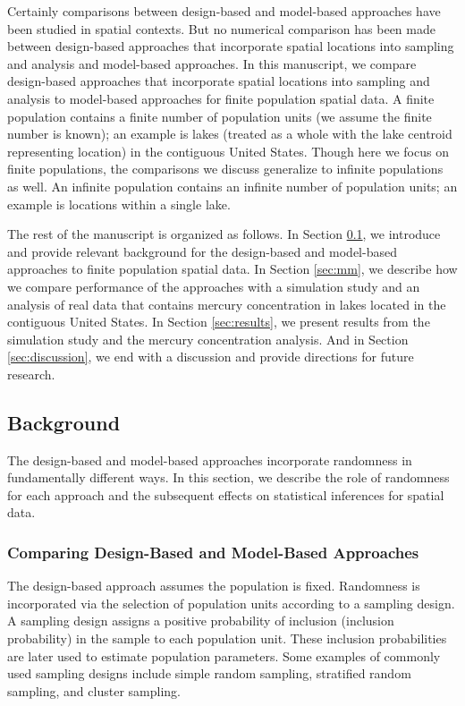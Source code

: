 \documentclass[]{elsarticle} %
\begin{document}
Certainly comparisons between design-based and model-based approaches
have been studied in spatial contexts. But no numerical comparison has
been made between design-based approaches that incorporate spatial
locations into sampling and analysis and model-based approaches. In this
manuscript, we compare design-based approaches that incorporate spatial
locations into sampling and analysis to model-based approaches for
finite population spatial data. A finite population contains a finite
number of population units (we assume the finite number is known); an
example is lakes (treated as a whole with the lake centroid representing
location) in the contiguous United States. Though here we focus on
finite populations, the comparisons we discuss generalize to infinite
populations as well. An infinite population contains an infinite number
of population units; an example is locations within a single lake.

The rest of the manuscript is organized as follows. In Section
\ref{sec:background}, we introduce and provide relevant background for
the design-based and model-based approaches to finite population spatial
data. In Section \ref{sec:mm}, we describe how we compare performance of
the approaches with a simulation study and an analysis of real data that
contains mercury concentration in lakes located in the contiguous United
States. In Section \ref{sec:results}, we present results from the
simulation study and the mercury concentration analysis. And in Section
\ref{sec:discussion}, we end with a discussion and provide directions
for future research.

\hypertarget{sec:background}{%
\subsection{Background}\label{sec:background}}

The design-based and model-based approaches incorporate randomness in
fundamentally different ways. In this section, we describe the role of
randomness for each approach and the subsequent effects on statistical
inferences for spatial data.

\hypertarget{subsec:dvm_compare}{%
\subsubsection{Comparing Design-Based and Model-Based
Approaches}\label{subsec:dvm_compare}}

The design-based approach assumes the population is fixed. Randomness is
incorporated via the selection of population units according to a
sampling design. A sampling design assigns a positive probability of
inclusion (inclusion probability) in the sample to each population unit.
These inclusion probabilities are later used to estimate population
parameters. Some examples of commonly used sampling designs include
simple random sampling, stratified random sampling, and cluster
sampling.
\end{document}
